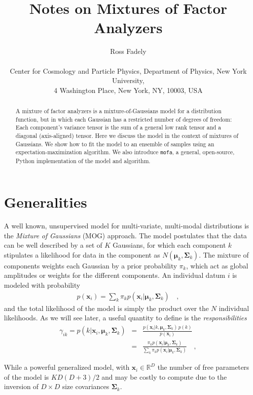 \documentclass[letterpaper,12pt]{article}
\title{Notes on Mixtures of Factor Analyzers}
\author{Ross Fadely\nyu\\
\\
\small
\nyu Center for Cosmology and Particle Physics,
                        Department of Physics, New York University,\\ \small
                        4 Washington Place, New York, NY, 10003, USA \\
}
\newcommand{\mofa}{\texttt{mofa}}
\newcommand{\vect}[1]{\boldsymbol{#1}}
\newcommand{\data}{\vect{x}}
\newcommand{\mean}{\vect{\mu}}
\newcommand{\cov}{\vect{\Sigma}}
\begin{document}
\maketitle

\begin{abstract}
A mixture of factor analyzers is a mixture-of-Gaussians model for a
distribution function, but in which each Gaussian has a restricted
number of degrees of freedom: Each component's variance tensor is the
sum of a general low rank tensor and a diagonal (axis-aligned) tensor.
Here we discuss the model in the context of mixtures of Gaussians.  We
show how to fit the model to an ensemble of samples using an
expectation-maximization algorithm.  We also introduce \mofa, a
general, open-source, Python implementation of the model and
algorithm.
\end{abstract}

\section{Generalities}

A well known, unsupervised model for multi-variate, multi-modal distributions is the 
\emph{Mixture of Gaussians} (MOG) approach.  The model postulates that the data can be well 
described by a set of $K$ Gaussians, for which each component $k$ stipulates a 
likelihood for data in the component as $N(\mean_k,\cov_k)$.  The mixture of 
components weights each Gaussian by a prior probability $\pi_k$, which act as 
global amplitudes or weights for the different components.  An individual datum $i$ is 
modeled with probability 
\begin{eqnarray}\displaystyle
p(\data_i) = \sum_k \pi_k p(\data_i|\mean_k,\cov_k)\quad ,
\end{eqnarray}
and the total likelihood of the model is simply the product over the $N$ individual likelihoods.  
As we will see later, a useful quantity to define is the \emph{responsibilities} 
\begin{eqnarray}\displaystyle
\label{eqn:rs}
\gamma_{ik} = p(k|\data_i,\mean_k,\cov_k) &=& \frac{p(\data_i|k,\mean_k,\cov_k)\,p(k)}{p(\data_i)} \\
 &=& \frac{\pi_k p(\data_i|\mean_k,\cov_k)}{\sum_k \pi_k p(\data_i|\mean_k,\cov_k)}
\quad ,
\end{eqnarray}

While a powerful generalized model, with $\data_i \in \mathbb{R}^D$ the number of 
free parameters of the model is $KD(D+3)/2$ and may be costly to compute due to 
the inversion of $D\times D$ size covariances $\cov_k$.  \\
\end{document}
